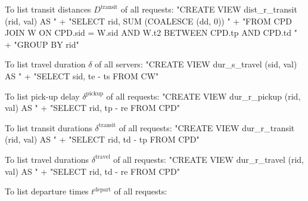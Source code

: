 \documentclass{article}
\def\nwendcode{\endtrivlist \endgroup}
\let\nwdocspar=\par
\theoremstyle{definition}
\begin{document}
To list transit distances $D^\textrm{transit}$ of all requests:
\nwenddocs{}\endmoddef{}
"CREATE VIEW dist_r_transit (rid, val) AS "
  + "SELECT rid, SUM (COALESCE (dd, 0)) "
  + "FROM CPD JOIN W ON CPD.sid = W.sid AND W.t2 BETWEEN CPD.tp AND CPD.td "
  + "GROUP BY rid"
\nwendcode{}\nwdocspar
To list travel duration $\delta$ of all servers:
\nwenddocs{}\endmoddef{}
"CREATE VIEW dur_s_travel (sid, val) AS "
  + "SELECT sid, te - ts FROM CW"
\nwendcode{}\nwdocspar
To list pick-up delay $\delta^\textrm{pickup}$ of all requests:
\nwenddocs{}\endmoddef{}
"CREATE VIEW dur_r_pickup (rid, val) AS "
  + "SELECT rid, tp - re FROM CPD"
\nwendcode{}\nwdocspar
To list transit durations $\delta^\textrm{transit}$ of all requests:
\nwenddocs{}\endmoddef{}
"CREATE VIEW dur_r_transit (rid, val) AS "
  + "SELECT rid, td - tp FROM CPD"
\nwendcode{}\nwdocspar
To list travel durations $\delta^\textrm{travel}$ of all requests:
\nwenddocs{}\endmoddef{}
"CREATE VIEW dur_r_travel (rid, val) AS "
  + "SELECT rid, td - re FROM CPD"
\nwendcode{}\nwdocspar
To list departure times $t^\textrm{depart}$ of all requests:
\end{document}
